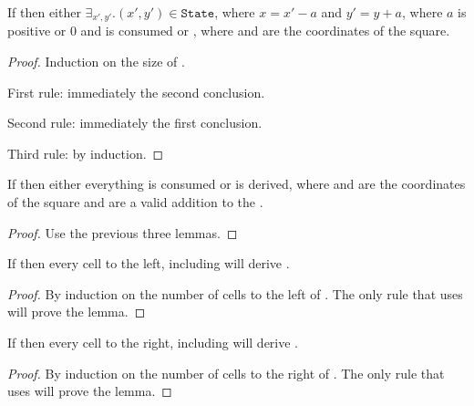 \begin{lemma}
If  then either $\exists_{x', y'}. {(x', y') \in \mathtt{State}}$, where $x = x' - a$ and $y' = y + a$, where $a$ is positive or $0$ and  is consumed or , where  and  are the coordinates of the square.
\end{lemma}
\begin{proof}
Induction on the size of .

First rule: immediately the second conclusion.

Second rule: immediately the first conclusion.

Third rule: by induction.
\end{proof}

\begin{theorem}
If  then either everything is consumed or  is derived, where  and  are the coordinates of the square and are a valid addition to the .
\end{theorem}
\begin{proof}
Use the previous three lemmas.
\end{proof}

\begin{lemma}
If  then every cell to the left, including  will derive .
\end{lemma}
\begin{proof}
By induction on the number of cells to the left of . The only rule that uses  will prove the lemma.
\end{proof}

\begin{lemma}
If  then every cell to the right, including  will derive .
\end{lemma}
\begin{proof}
By induction on the number of cells to the right of . The only rule that uses  will prove the lemma.
\end{proof}


